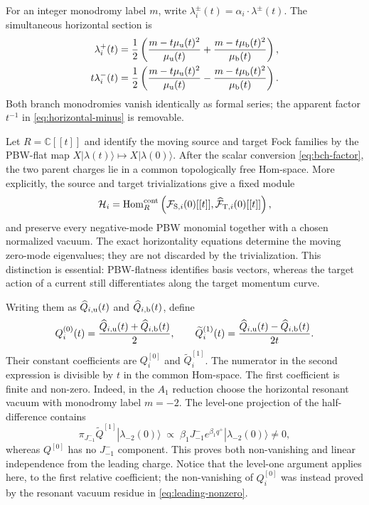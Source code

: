 \documentclass[11pt,a4paper]{article}
\numberwithin{equation}{section}
\theoremstyle{remark}
\newcommand{\Hom}{\operatorname{Hom}}
\begin{document}
For an integer monodromy label $m$, write
$\lambda_i^\pm(t)=\alpha_i\cdot\lambda^\pm(t)$.  The simultaneous horizontal section is
\begin{align}
 \lambda_i^+(t)&=\frac12\left(
 \frac{m-t\mu_{\rm u}(t)^2}{\mu_{\rm u}(t)}
 +\frac{m-t\mu_{\rm b}(t)^2}{\mu_{\rm b}(t)}\right),
 \label{eq:horizontal-plus}\\
 t\lambda_i^-(t)&=\frac12\left(
 \frac{m-t\mu_{\rm u}(t)^2}{\mu_{\rm u}(t)}
 -\frac{m-t\mu_{\rm b}(t)^2}{\mu_{\rm b}(t)}\right).
 \label{eq:horizontal-minus}
\end{align}
Both branch monodromies vanish identically as formal series; the apparent factor $t^{-1}$ in
\cref{eq:horizontal-minus} is removable.

Let $R=\mathbb C[[t]]$ and identify the moving source and target Fock families by the PBW-flat
map $X|\lambda(t)\rangle\mapsto X|\lambda(0)\rangle$.  After the scalar conversion
\cref{eq:bch-factor}, the two parent charges lie in a common topologically free Hom-space.
More explicitly, the source and target trivializations give a fixed module
\begin{equation}
 \mathcal H_i=\Hom_R^{\rm cont}
 \left(\mathcal F_{{\rm S},i}(0)[[t]],
       \widehat{\mathcal F}_{{\rm T},i}(0)[[t]]\right),
 \label{eq:common-hom-space}
\end{equation}
and preserve every negative-mode PBW monomial together with a chosen normalized vacuum.
The exact horizontality equations determine the moving zero-mode eigenvalues; they are not
discarded by the trivialization.  This distinction is essential: PBW-flatness identifies basis
vectors, whereas the target action of a current still differentiates along the target momentum
curve.

Writing them as $\widehat Q_{i,\rm u}(t)$ and $\widehat Q_{i,\rm b}(t)$, define
\begin{equation}
 Q_i^{(0)}(t)=\frac{\widehat Q_{i,\rm u}(t)+\widehat Q_{i,\rm b}(t)}2,\qquad
 \widetilde Q_i^{(1)}(t)=
 \frac{\widehat Q_{i,\rm u}(t)-\widehat Q_{i,\rm b}(t)}{2t}.
 \label{eq:channel-families}
\end{equation}
Their constant coefficients are $Q_i^{[0]}$ and $\widetilde Q_i^{[1]}$.  The numerator in the
second expression is divisible by $t$ in the common Hom-space.  The first coefficient is
finite and non-zero.  Indeed, in the $A_1$ reduction choose the horizontal resonant vacuum
with monodromy label $m=-2$.  The level-one projection of the half-difference contains
\begin{equation}
 \pi_{J^-_{-1}}\widetilde Q^{[1]}|\lambda_{-2}(0)\rangle
 \;\propto\;
 \beta_1J^-_{-1}e^{\beta_1q^+}|\lambda_{-2}(0)\rangle\ne0,
 \label{eq:tangent-nonzero}
\end{equation}
whereas $Q^{[0]}$ has no $J^-_{-1}$ component.  This proves both non-vanishing and linear
independence from the leading charge.  Notice that the level-one argument applies here, to the
first relative coefficient; the non-vanishing of $Q_i^{[0]}$ was instead proved by the resonant
vacuum residue in \cref{eq:leading-nonzero}.
\end{document}
